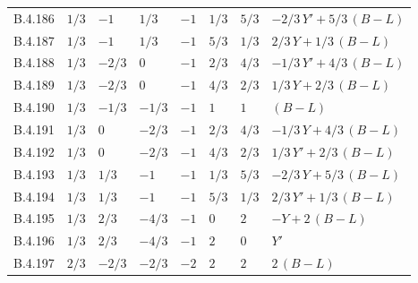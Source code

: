 {\begin{longtable}{@{}lllllll>{\raggedright\arraybackslash}p{5.6cm}@{}}
B.4.186 & $1/3$ & $-1$ & $1/3$ & $-1$ & $1/3$ & $5/3$ & $-2/3\,Y'+5/3\,(B{-}L)$ \\
B.4.187 & $1/3$ & $-1$ & $1/3$ & $-1$ & $5/3$ & $1/3$ & $2/3\,Y+1/3\,(B{-}L)$ \\
B.4.188 & $1/3$ & $-2/3$ & $0$ & $-1$ & $2/3$ & $4/3$ & $-1/3\,Y'+4/3\,(B{-}L)$ \\
B.4.189 & $1/3$ & $-2/3$ & $0$ & $-1$ & $4/3$ & $2/3$ & $1/3\,Y+2/3\,(B{-}L)$ \\
B.4.190 & $1/3$ & $-1/3$ & $-1/3$ & $-1$ & $1$ & $1$ & $(B{-}L)$ \\
B.4.191 & $1/3$ & $0$ & $-2/3$ & $-1$ & $2/3$ & $4/3$ & $-1/3\,Y+4/3\,(B{-}L)$ \\
B.4.192 & $1/3$ & $0$ & $-2/3$ & $-1$ & $4/3$ & $2/3$ & $1/3\,Y'+2/3\,(B{-}L)$ \\
B.4.193 & $1/3$ & $1/3$ & $-1$ & $-1$ & $1/3$ & $5/3$ & $-2/3\,Y+5/3\,(B{-}L)$ \\
B.4.194 & $1/3$ & $1/3$ & $-1$ & $-1$ & $5/3$ & $1/3$ & $2/3\,Y'+1/3\,(B{-}L)$ \\
B.4.195 & $1/3$ & $2/3$ & $-4/3$ & $-1$ & $0$ & $2$ & $-Y+2\,(B{-}L)$ \\
B.4.196 & $1/3$ & $2/3$ & $-4/3$ & $-1$ & $2$ & $0$ & $Y'$ \\
B.4.197 & $2/3$ & $-2/3$ & $-2/3$ & $-2$ & $2$ & $2$ & $2\,(B{-}L)$ \\
\end{longtable}}
